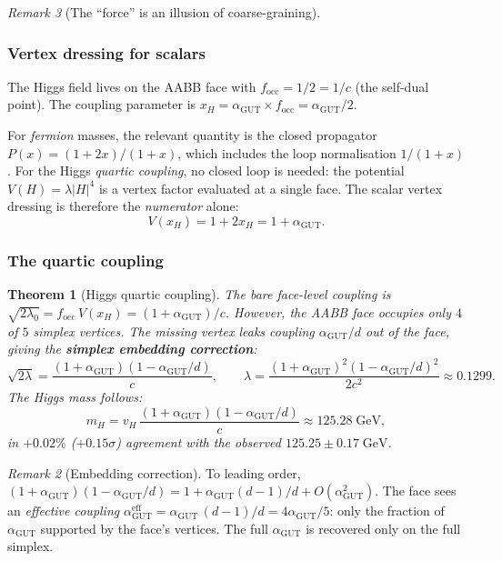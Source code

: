 \documentclass[12pt]{article}
\newtheorem{theorem}{Theorem}[section]
\theoremstyle{remark}
\newtheorem{remark}[theorem]{Remark}
\theoremstyle{definition}
\newcommand{\agut}{\alpha_{\mathrm{GUT}}}
\begin{document}
\begin{remark}[The ``force'' is an illusion of coarse-graining]
\subsubsection{Vertex dressing for scalars}

The Higgs field lives on the AABB face with $f_\mathrm{occ} = 1/2 = 1/c$ (the self-dual point).  The coupling parameter is $x_H = \agut \times f_\mathrm{occ} = \agut/2$.

For \emph{fermion} masses, the relevant quantity is the closed propagator $P(x) = (1+2x)/(1+x)$, which includes the loop normalisation $1/(1+x)$.  For the Higgs \emph{quartic coupling}, no closed loop is needed: the potential $V(H) = \lambda|H|^4$ is a vertex factor evaluated at a single face.  The scalar vertex dressing is therefore the \emph{numerator} alone:
\begin{equation}
V(x_H) = 1 + 2x_H = 1 + \agut.
\end{equation}

\subsubsection{The quartic coupling}

\begin{theorem}[Higgs quartic coupling]
\label{thm:higgs_quartic}
The bare face-level coupling is $\sqrt{2\lambda_0} = f_\mathrm{occ}\,V(x_H) = (1+\agut)/c$.  However, the AABB face occupies only $4$ of $5$ simplex vertices.  The missing vertex leaks coupling $\agut/d$ out of the face, giving the \textbf{simplex embedding correction}:
\begin{equation}
\boxed{\sqrt{2\lambda} = \frac{(1 + \agut)(1 - \agut/d)}{c},
\qquad
\lambda = \frac{(1 + \agut)^2(1 - \agut/d)^2}{2c^2} \approx 0.1299.}
\end{equation}
The Higgs mass follows:
\begin{equation}
m_H = v_H\,\frac{(1+\agut)(1-\agut/d)}{c} \approx 125.28\;\mathrm{GeV},
\end{equation}
in $+0.02\%$ ($+0.15\sigma$) agreement with the observed $125.25 \pm 0.17\;\mathrm{GeV}$.
\end{theorem}

\begin{remark}[Embedding correction]
To leading order, $(1+\agut)(1-\agut/d) = 1 + \agut(d-1)/d + O(\agut^2)$.  The face sees an \emph{effective coupling} $\agut^\mathrm{eff} = \agut\,(d-1)/d = 4\agut/5$: only the fraction of $\agut$ supported by the face's vertices.  The full $\agut$ is recovered only on the full simplex.
\end{remark}


\end{remark}
\end{document}
